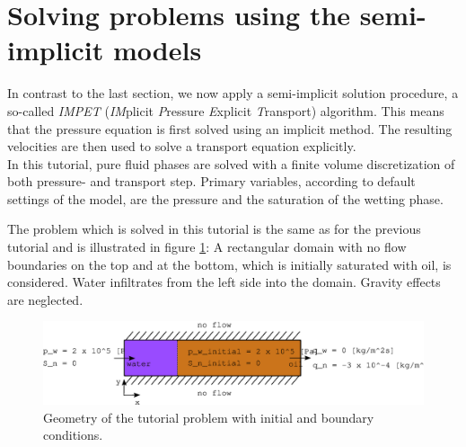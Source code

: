 \section{Solving problems using the semi-implicit models}
\label{tutorial-decoupled}

In contrast to the last section, we now apply a semi-implicit solution procedure, a
so-called \textit{IMPET} (\textit{IM}plicit \textit{P}ressure \textit{E}xplicit 
\textit{T}ransport) algorithm. This means that the pressure equation is first 
solved using an implicit method. The resulting velocities are then used to solve
a transport equation explicitly.\\
In this tutorial, pure fluid phases are solved with a finite volume discretization
of both pressure- and transport step. Primary variables, according to default
settings of the model, are the pressure and the saturation of the wetting phase.

The problem which is solved in this tutorial is the same as for the previous tutorial and is illustrated in figure 
\ref{tutorial-decoupled:problemfigure}: A rectangular domain with no flow 
boundaries on the top and at the bottom, which is initially saturated with oil, 
is considered. Water infiltrates from the left side into the domain. Gravity 
effects are neglected.

\begin{figure}[ht]
\centering
\includegraphics[width=0.9\linewidth,keepaspectratio]{EPS/tutorial-problemconfiguration}
\caption{Geometry of the tutorial problem with initial and boundary conditions.}\label{tutorial-decoupled:problemfigure}
\end{figure}

